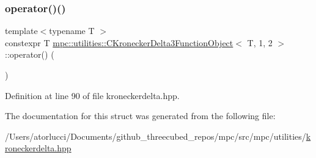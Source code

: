 \subsubsection{\texorpdfstring{operator()()}{operator()()}}
{\footnotesize\ttfamily template$<$typename T $>$ \\
constexpr T \mbox{\hyperlink{structmpc_1_1utilities_1_1_c_kronecker_delta3_function_object}{mpc\+::utilities\+::\+C\+Kronecker\+Delta3\+Function\+Object}}$<$ T, 1, 2 $>$\+::operator() (\begin{DoxyParamCaption}{ }\end{DoxyParamCaption})\hspace{0.3cm}{\ttfamily [inline]}}



Definition at line 90 of file kroneckerdelta.\+hpp.



The documentation for this struct was generated from the following file\+:\begin{DoxyCompactItemize}
\item 
/\+Users/atorlucci/\+Documents/github\+\_\+threecubed\+\_\+repos/mpc/src/mpc/utilities/\mbox{\hyperlink{kroneckerdelta_8hpp}{kroneckerdelta.\+hpp}}\end{DoxyCompactItemize}
